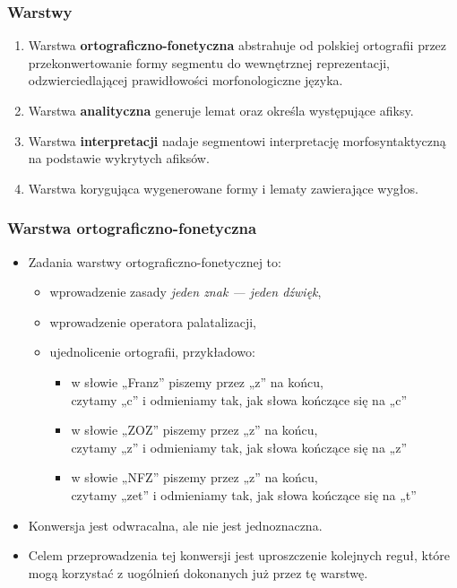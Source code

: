 \documentclass{beamer}
\begin{document}
\begin{frame}
\frametitle{Warstwy}
\begin{enumerate}
\item Warstwa \textbf{ortograficzno-fonetyczna} abstrahuje od polskiej ortografii przez przekonwertowanie formy segmentu do wewnętrznej reprezentacji, odzwierciedlającej prawidłowości morfonologiczne języka.
\item Warstwa \textbf{analityczna} generuje lemat oraz określa występujące afiksy.
\item Warstwa \textbf{interpretacji} nadaje segmentowi interpretację morfosyntaktyczną na podstawie wykrytych afiksów.
\item Warstwa korygująca wygenerowane formy i lematy zawierające wygłos.
\end{enumerate}
\end{frame}

\begin{frame}
\frametitle{Warstwa ortograficzno-fonetyczna}
\begin{itemize}
\item Zadania warstwy ortograficzno-fonetycznej to:
\begin{itemize}
\item wprowadzenie zasady {\it jeden znak --- jeden dźwięk},
\item wprowadzenie operatora palatalizacji,
\item ujednolicenie ortografii, przykładowo:
\begin{itemize}
\item w słowie „Franz” piszemy przez „z” na końcu, \\czytamy „c” i odmieniamy tak, jak słowa kończące się na „c”
\item w słowie „ZOZ” piszemy przez „z” na końcu, \\czytamy „z” i odmieniamy tak, jak słowa kończące się na „z”
\item w słowie „NFZ” piszemy przez „z” na końcu, \\czytamy „zet” i odmieniamy tak, jak słowa kończące się na „t”
\end{itemize}
\end{itemize}
\item Konwersja jest odwracalna, ale nie jest jednoznaczna.
\item Celem przeprowadzenia tej konwersji jest uproszczenie kolejnych reguł, które mogą korzystać z uogólnień dokonanych już przez tę warstwę.
\end{itemize}
\end{frame}
\end{document}

